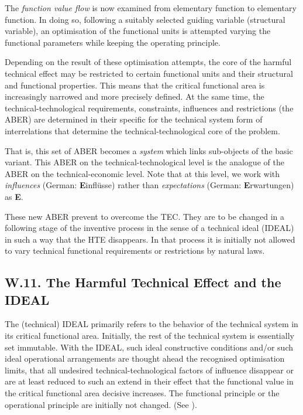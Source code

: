 \documentclass[11pt,a4paper]{article}
\begin{document}
The \emph{function value flow} is now examined from elementary function to
elementary function.  In doing so, following a suitably selected guiding
variable (structural variable), an optimisation of the functional units is
attempted varying the functional parameters while keeping the operating
principle.

Depending on the result of these optimisation attempts, the core of the
harmful technical effect may be restricted to certain functional units and
their structural and functional properties. This means that the critical
functional area is increasingly narrowed and more precisely defined.  At the
same time, the technical-technological requirements, constraints, influences
and restrictions (the ABER) are determined in their specific for the technical
system form of interrelations that determine the technical-technological core
of the problem.

That is, this set of ABER becomes a \emph{system} which links sub-objects of
the basic variant. This ABER on the technical-technological level is the
analogue of the ABER on the technical-economic level. Note that at this level,
we work with \emph{influences} (German: \textbf{E}inflüsse) rather than
\emph{expectations} (German: \textbf{E}rwartungen) as \textbf{E}.

These new ABER prevent to overcome the TEC. They are to be changed in a
following stage of the inventive process in the sense of a technical ideal
(IDEAL) in such a way that the HTE disappears. In that process it is initially
not allowed to vary technical functional requirements or restrictions by
natural laws.

\subsection*{W.11. The Harmful Technical Effect and the IDEAL}

The (technical) IDEAL primarily refers to the behavior of the technical system
in its critical functional area. Initially, the rest of the technical system
is essentially set immutable. With the IDEAL, such ideal constructive
conditions and/or such ideal operational arrangements are thought ahead the
recognised optimisation limits, that all undesired technical-technological
factors of influence disappear or are at least reduced to such an extend in
their effect that the functional value in the critical functional area
decisive increases. The functional principle or the operational principle are
initially not changed.  (See \cite[A.6]{RM-21}).
\end{document}
